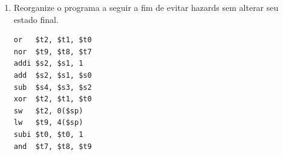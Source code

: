 \documentclass{article}
\begin{document}
\begin{enumerate}
\begin{table}[H]
\begin{tabular}{|l|l|l|l|l|l|l|l|l|l|l|l|l|l|l|l|l|l|}
  &     &     &     &     &     &     &     &     &     &     &     &     &     &     &     &     &     \\ \hline
 &     &     &     &     &     &     &     &     &     &     &     &     &     &     &     &     &     \\ \hline
 &     &     &     &     &     &     &     &     &     &     &     &     &     &     &     &     &     \\ \hline
 &     &     &     &     &     &     &     &     &     &     &     &     &     &     &     &     &     \\ \hline
 &     &     &     &     &     &     &     &     &     &     &     &     &     &     &     &     &     \\ \hline
 &     &     &     &     &     &     &     &     &     &     &     &     &     &     &     &     &     \\ \hline
 &     &     &     &     &     &     &     &     &     &     &     &     &     &     &     &     &     \\ \hline
 &     &     &     &     &     &     &     &     &     &     &     &     &     &     &     &     &     \\ \hline
 &     &     &     &     &     &     &     &     &     &     &     &     &     &     &     &     &     \\ \hline
 &     &     &     &     &     &     &     &     &     &     &     &     &     &     &     &     &     \\ \hline
 &     &     &     &     &     &     &     &     &     &     &     &     &     &     &     &     &     \\ \hline
 &     &     &     &     &     &     &     &     &     &     &     &     &     &     &     &     &     \\ \hline
 &     &     &     &     &     &     &     &     &     &     &     &     &     &     &     &     &     \\ \hline
 &     &     &     &     &     &     &     &     &     &     &     &     &     &     &     &     &     \\ \hline
\end{tabular}
\end{table}

\pagebreak

\item Reorganize o programa a seguir a fim de evitar hazards sem alterar seu estado final.

\begin{center}
    \begin{minipage}{0.3\textwidth}
        \begin{lstlisting}[frame=single]
or   $t2, $t1, $t0
nor  $t9, $t8, $t7
addi $s2, $s1, 1
add  $s2, $s1, $s0
sub  $s4, $s3, $s2
xor  $t2, $t1, $t0
sw   $t2, 0($sp)
lw   $t9, 4($sp)
subi $t0, $t0, 1
and  $t7, $t8, $t9
        \end{lstlisting}
    \end{minipage}
\end{center}



\end{enumerate}
\end{document}
